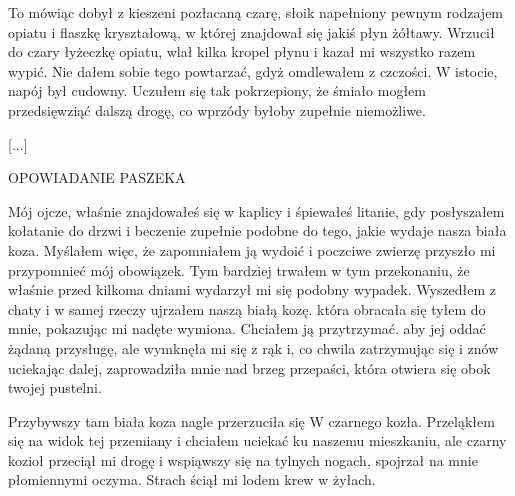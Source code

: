 To mówiąc dobył z kieszeni pozłacaną czarę, słoik napełniony pewnym
rodzajem opiatu i flaszkę kryształową, w której znajdował się jakiś
płyn żółtawy. Wrzucił do czary łyżeczkę opiatu, wlał kilka kropel
płynu i kazał mi wszystko razem wypić. Nie dałem sobie tego powtarzać,
gdyż omdlewałem z czczości. W istocie, napój był cudowny. Uczułem się
tak pokrzepiony, że śmiało mogłem przedsięwziąć dalszą drogę, co
wprzódy byłoby zupełnie niemożliwe.

[...]


OPOWIADANIE PASZEKA

Mój ojcze, właśnie znajdowałeś się w kaplicy i śpiewałeś litanie, gdy
posłyszałem kołatanie do drzwi i beczenie zupełnie podobne do tego,
jakie wydaje nasza biała koza. Myślałem więc, że zapomniałem ją wydoić
i poczciwe zwierzę przyszło mi przypomnieć mój obowiązek. Tym bardziej
trwałem w tym przekonaniu, że właśnie przed kilkoma dniami wydarzył mi
się podobny wypadek. Wyszedłem z chaty i w samej rzeczy ujrzałem naszą
białą kozę. która obracała się tyłem do mnie, pokazując mi nadęte
wymiona. Chciałem ją przytrzymać. aby jej oddać żądaną przysługę, ale
wymknęła mi się z rąk i, co chwila zatrzymując się i znów uciekając
dalej, zaprowadziła mnie nad brzeg przepaści, która otwiera się obok
twojej pustelni.

Przybywszy tam biała koza nagle przerzuciła się W czarnego
kozła. Przeląkłem się na widok tej przemiany i chciałem uciekać ku
naszemu mieszkaniu, ale czarny kozioł przeciął mi drogę i wspiąwszy
się na tylnych nogach, spojrzał na mnie płomiennymi oczyma. Strach
ściął mi lodem krew w żyłach.
